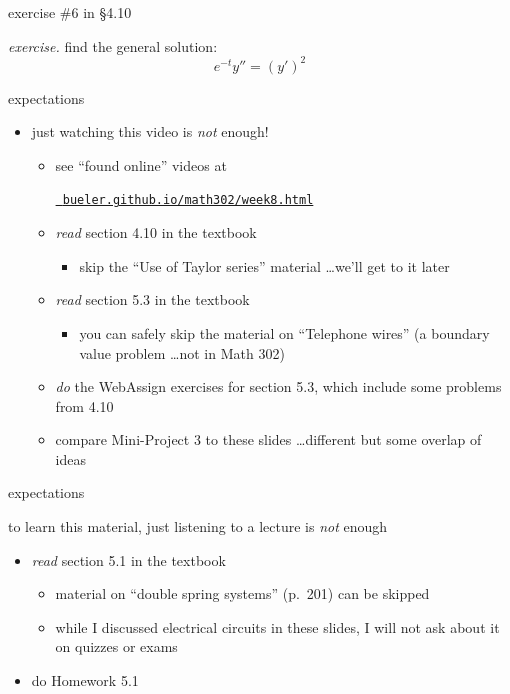 \documentclass[dvipsnames,colorlinks]{beamer}
\begin{document}
\begin{frame}{exercise \#6 in \S 4.10}

\noindent \emph{exercise.}  find the general solution:
    $$e^{-t} y'' = (y')^2$$

\vspace{60mm}
\end{frame}


\begin{frame}{expectations}

\begin{itemize}
\item just watching this video is \emph{not} enough!
     \begin{itemize}
     \item see ``found online'' videos at

     \centerline{\href{https://bueler.github.io/math302/week8.html}{\tt \color{cyan} bueler.github.io/math302/week8.html}}
     \item \emph{read} section 4.10 in the textbook
         \begin{itemize}
         \item skip the ``Use of Taylor series'' material \dots we'll get to it later
         \end{itemize}
     \item \emph{read} section 5.3 in the textbook
         \begin{itemize}
         \item you can safely skip the material on ``Telephone wires'' (a boundary value problem \dots not in Math 302)
         \end{itemize}
     \item \emph{do} the WebAssign exercises for section 5.3, which include some problems from 4.10
     \item compare Mini-Project 3 to these slides \dots different but some overlap of ideas
     \end{itemize}
\end{itemize}
\end{frame}



\begin{frame}{expectations}

to learn this material, just listening to a lecture is \emph{not} enough
     \begin{itemize}
     \item \emph{read} section 5.1 in the textbook
         \begin{itemize}
         \item material on ``double spring systems'' (p.~201) can be skipped
         \item while I discussed electrical circuits in these slides, I will not ask about it on quizzes or exams
         \end{itemize}
     \item do Homework 5.1
     \end{itemize}
\end{frame}
\end{document}

